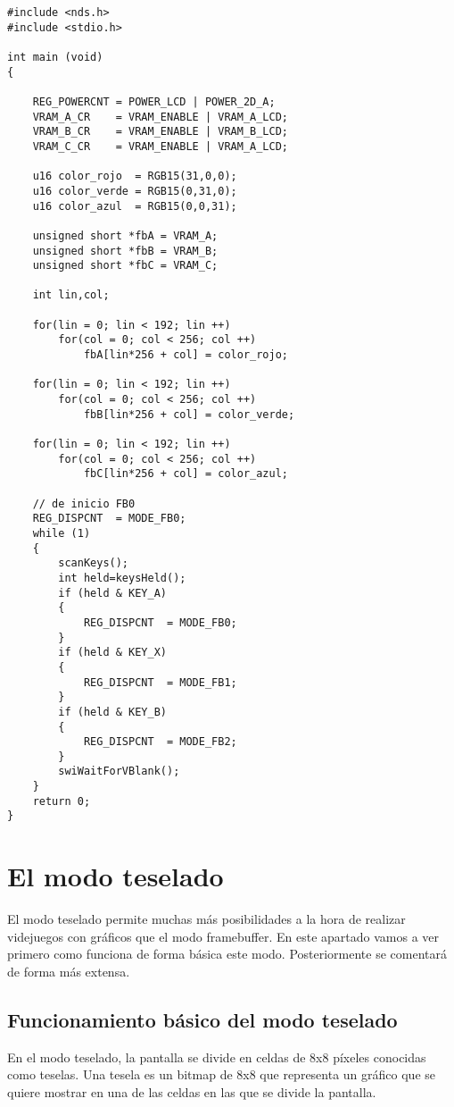 \begin{lstlisting}	
#include <nds.h>
#include <stdio.h>

int main (void)
{
	
	REG_POWERCNT = POWER_LCD | POWER_2D_A;
	VRAM_A_CR    = VRAM_ENABLE | VRAM_A_LCD;
	VRAM_B_CR    = VRAM_ENABLE | VRAM_B_LCD;
	VRAM_C_CR    = VRAM_ENABLE | VRAM_A_LCD;
	
	u16 color_rojo  = RGB15(31,0,0);
	u16 color_verde = RGB15(0,31,0);
	u16 color_azul  = RGB15(0,0,31);
	
	unsigned short *fbA = VRAM_A;
	unsigned short *fbB = VRAM_B;
	unsigned short *fbC = VRAM_C;
	
	int lin,col;
	
	for(lin = 0; lin < 192; lin ++)
		for(col = 0; col < 256; col ++)
			fbA[lin*256 + col] = color_rojo;
	
	for(lin = 0; lin < 192; lin ++)
		for(col = 0; col < 256; col ++)
			fbB[lin*256 + col] = color_verde;
	
	for(lin = 0; lin < 192; lin ++)
		for(col = 0; col < 256; col ++)
			fbC[lin*256 + col] = color_azul;
	
	// de inicio FB0
	REG_DISPCNT  = MODE_FB0;
	while (1)
	{
		scanKeys();
		int held=keysHeld();
		if (held & KEY_A)
		{
			REG_DISPCNT  = MODE_FB0;
		}
		if (held & KEY_X)
		{
			REG_DISPCNT  = MODE_FB1;
		}
		if (held & KEY_B)
		{
			REG_DISPCNT  = MODE_FB2;
		}
		swiWaitForVBlank();
	}
	return 0;
}
\end{lstlisting}

\section{El modo teselado}
El modo teselado permite muchas más posibilidades a la hora de realizar videjuegos con gráficos que el modo framebuffer. En este apartado vamos a ver primero como funciona de forma básica este modo. Posteriormente se comentará de forma más extensa.

\subsection{Funcionamiento básico del modo teselado}
En el modo teselado, la pantalla se divide en celdas de 8x8 píxeles conocidas como teselas. Una tesela es un bitmap de 8x8 que representa un gráfico que se quiere mostrar en una de las celdas en las que se divide la pantalla. 

